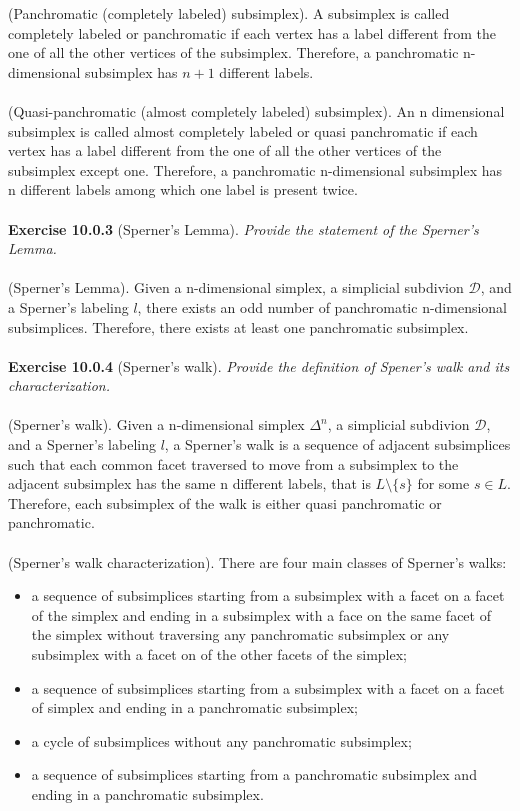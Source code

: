 (Panchromatic (completely labeled) subsimplex). A subsimplex is called completely labeled or panchromatic if each vertex has a label different from the one of all the other vertices of the subsimplex. Therefore, a panchromatic n-dimensional subsimplex has $n+1$ different labels.\\\\
(Quasi-panchromatic (almost completely labeled) subsimplex). An n dimensional subsimplex is called almost completely labeled or quasi panchromatic if each vertex has a label different from the one of all the other vertices of the subsimplex except one. Therefore, a panchromatic n-dimensional subsimplex has n different labels among which one label is present twice.\\\\
\textbf{Exercise 10.0.3} (Sperner’s Lemma). \textit{Provide the statement of the Sperner’s Lemma.}\\\\
(Sperner’s Lemma). Given a n-dimensional simplex, a simplicial subdivion $ \mathcal{D} $, and a Sperner’s labeling $l$, there exists an odd number of panchromatic n-dimensional subsimplices. Therefore, there exists at least one panchromatic subsimplex.\\\\
\textbf{Exercise 10.0.4} (Sperner’s walk). \textit{Provide the definition of Spener’s walk and its characterization.}\\\\
(Sperner’s walk). Given a n-dimensional simplex $\Delta^n$, a simplicial subdivion $ \mathcal{D} $, and a Sperner’s labeling $l$, a Sperner’s walk is a sequence of adjacent subsimplices such that each common facet traversed to move from a subsimplex to the adjacent subsimplex has the same n different labels, that is $L \setminus \{s\}$ for some $s \in L$.
Therefore, each subsimplex of the walk is either quasi panchromatic or panchromatic.\\\\
(Sperner’s walk characterization). There are four main classes of Sperner’s walks:
\begin{itemize}
\item a sequence of subsimplices starting from a subsimplex with a facet on a facet of the simplex and ending in a subsimplex with a face on the same facet of the simplex without traversing any panchromatic subsimplex or any subsimplex with a facet on of the other facets of the simplex;
\item a sequence of subsimplices starting from a subsimplex with a facet on a facet of simplex and ending in a panchromatic subsimplex;
\item a cycle of subsimplices without any panchromatic subsimplex;
\item a sequence of subsimplices starting from a panchromatic subsimplex and ending in a panchromatic subsimplex.
\end{itemize}
